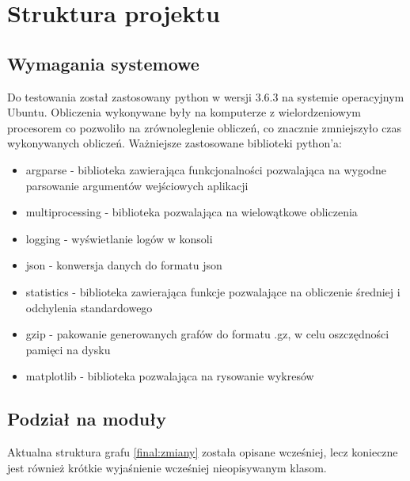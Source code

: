 
\section{Struktura projektu}
	\label{final:struktura}

	\subsection{Wymagania systemowe}
		\label{final:struktura:wymagania}

		Do testowania został zastosowany python w wersji 3.6.3 na systemie operacyjnym Ubuntu. Obliczenia wykonywane były na komputerze z wielordzeniowym procesorem co pozwoliło na zrównoleglenie obliczeń, co znacznie zmniejszyło czas wykonywanych obliczeń. Ważniejsze zastosowane biblioteki python'a:
		\begin{itemize}
			\item argparse - biblioteka zawierająca funkcjonalności pozwalająca na wygodne parsowanie argumentów wejściowych aplikacji
			\item multiprocessing - biblioteka pozwalająca na wielowątkowe obliczenia
			\item logging - wyświetlanie logów w konsoli
			\item json - konwersja danych do formatu json
			\item statistics - biblioteka zawierająca funkcje pozwalające na obliczenie średniej i odchylenia standardowego
			\item gzip - pakowanie generowanych grafów do formatu .gz, w celu oszczędności pamięci na dysku
			\item matplotlib - biblioteka pozwalająca na rysowanie wykresów
		\end{itemize}

	\subsection{Podział na moduły}
		\label{final:struktura:klasy}


		Aktualna struktura grafu \ref{final:zmiany} została opisane wcześniej, lecz konieczne jest również krótkie wyjaśnienie wcześniej nieopisywanym klasom.

